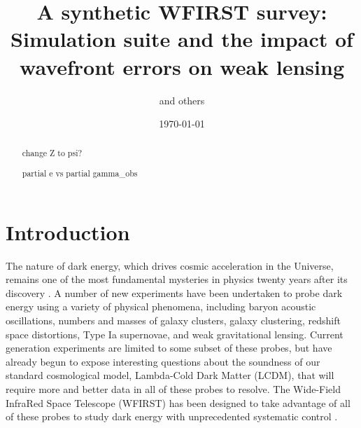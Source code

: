 \documentclass[aps,prd, amsmath,amssymb,superscriptaddress,showkeys,nofootinbib,reprint,preprintnumbers]{revtex4-1}
\begin{document}
\title{A synthetic WFIRST survey: Simulation suite and the impact of wavefront errors on weak lensing}

\author{and others}


\noaffiliation

\date{\today}

\label{firstpage}

\begin{abstract}
change Z to psi?

partial e vs partial gamma\_obs
\end{abstract}

\keywords{}

\maketitle


\section{Introduction}\label{sec:intro}

The nature of dark energy, which drives cosmic acceleration in the Universe, remains one of the most fundamental mysteries in physics twenty years after its discovery \cite{riess98,perlmutter99,detf,Frieman:2008sn,weinberg13}. 
A number of new experiments have been undertaken to probe dark energy using a variety of physical phenomena, including baryon acoustic oscillations, numbers and masses of galaxy clusters, galaxy clustering, redshift space distortions, Type Ia supernovae, and weak gravitational lensing. 
Current generation experiments are limited to some subset of these probes, but have already begun to expose interesting questions about the soundness of our standard cosmological model, Lambda-Cold Dark Matter (LCDM), that will require more and better data in all of these probes to resolve. 
The Wide-Field InfraRed Space Telescope (WFIRST) \cite{wfirst} has been designed to take advantage of all of these probes to study dark energy with unprecedented systematic control \cite{2019BAAS...51c.341D,2019arXiv190205569A}.
\end{document}
